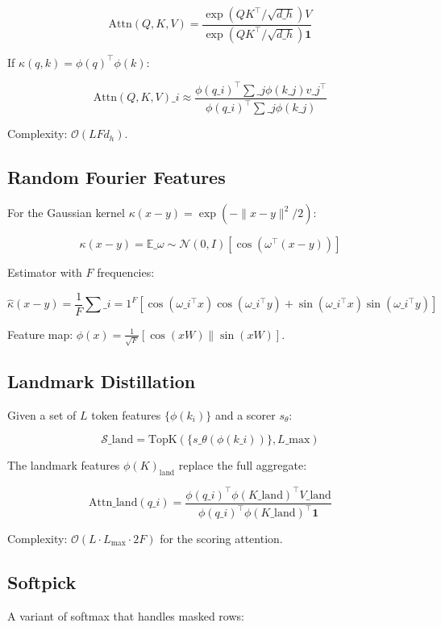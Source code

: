 \[
\text{Attn}(Q, K, V) = \frac{\exp(QK^\top / \sqrt{d\_h}) V}{\exp(QK^\top / \sqrt{d\_h}) \mathbf{1}}
\tag{3.1}
\]

If $\kappa(q, k) = \phi(q)^\top \phi(k)$:

\[
\text{Attn}(Q, K, V)\_i \approx \frac{\phi(q\_i)^\top \sum\_j \phi(k\_j) v\_j^\top}{\phi(q\_i)^\top \sum\_j \phi(k\_j)}
\tag{3.2}
\]

Complexity: $\mathcal{O}(L F d_h)$.

\subsection{Random Fourier Features}

For the Gaussian kernel $\kappa(x - y) = \exp(-\|x - y\|^2 / 2)$:

\[
\kappa(x - y) = \mathbb{E}\_{\omega \sim \mathcal{N}(0, I)}[\cos(\omega^\top (x - y))]
\tag{3.3}
\]

Estimator with $F$ frequencies:

\[
\hat{\kappa}(x - y) = \frac{1}{F} \sum\_{i=1}^F [\cos(\omega\_i^\top x)\cos(\omega\_i^\top y) + \sin(\omega\_i^\top x)\sin(\omega\_i^\top y)]
\tag{3.4}
\]

Feature map: $\phi(x) = \frac{1}{\sqrt{F}} [\cos(xW) \| \sin(xW)]$.

\subsection{Landmark Distillation}

Given a set of $L$ token features $\{\phi(k_i)\}$ and a scorer $s_\theta$:

\[
\mathcal{S}\_\text{land} = \text{TopK}(\{s\_\theta(\phi(k\_i))\}, L\_\text{max})
\tag{3.5}
\]

The landmark features $\phi(K)_\text{land}$ replace the full aggregate:

\[
\text{Attn}\_\text{land}(q\_i) = \frac{\phi(q\_i)^\top \phi(K\_\text{land})^\top V\_\text{land}}{\phi(q\_i)^\top \phi(K\_\text{land})^\top \mathbf{1}}
\tag{3.6}
\]

Complexity: $\mathcal{O}(L \cdot L_\text{max} \cdot 2F)$ for the scoring 
attention.

\subsection{Softpick}

A variant of softmax that handles masked rows:

